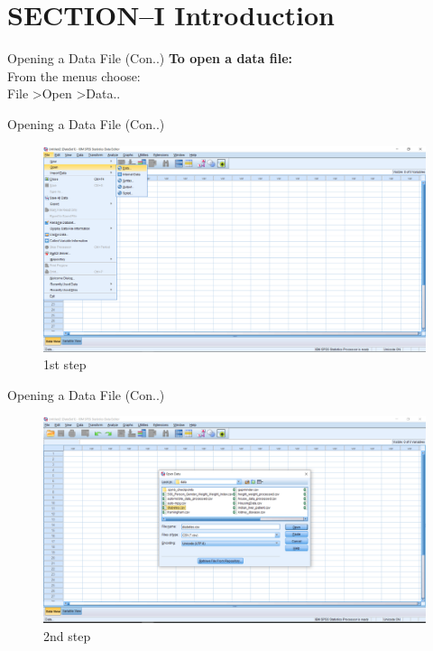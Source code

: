


\maketitle
\section{SECTION--I Introduction}
\begin{frame}[t]{Opening a Data File (Con..)}
      \textbf{To open a data file:}\\
      	From the menus choose:\\
      	File \textgreater Open \textgreater Data..\\
\end{frame}
\begin{frame}[t]{Opening a Data File (Con..)}
		\begin{figure}
			\centering
			\includegraphics[width=12cm]{img/o_data_1}
			\caption{1st step}
		\end{figure}
\end{frame}
\begin{frame}[t]{Opening a Data File (Con..)}
		\begin{figure}
			\centering
			\includegraphics[width=12cm]{img/o_data_2}
			\caption{2nd step}
		\end{figure}
\end{frame}
